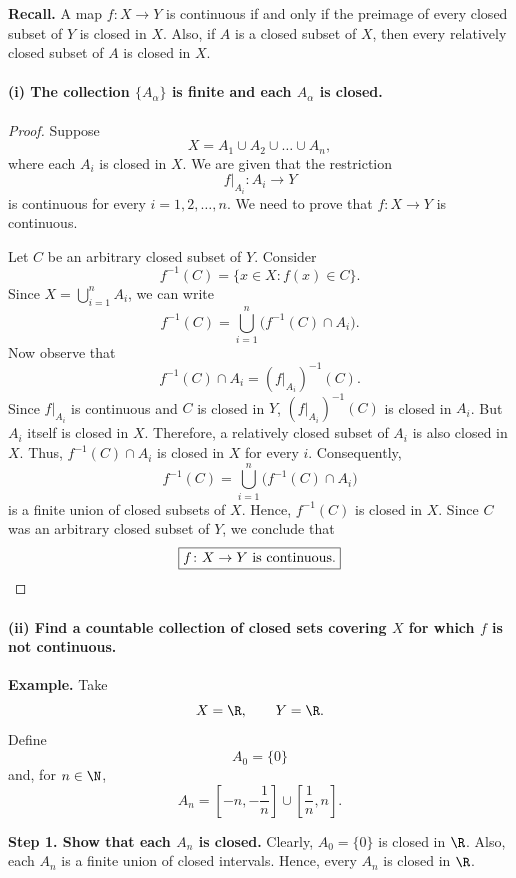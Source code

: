 
\textbf{Recall.}
A map $f\colon X\to Y$ is continuous if and only if the preimage of every closed subset of $Y$
is closed in $X$. Also, if $A$ is a closed subset of $X$, then every relatively closed subset
of $A$ is closed in $X$.

\paragraph{(i) The collection $\{A_\alpha\}$ is finite and each $A_\alpha$ is closed.}
\begin{proof}
Suppose
\[ X=A_1\cup A_2\cup\dots\cup A_n, \]
where each $A_i$ is closed in $X$. We are given that the restriction
\[ f|_{A_i}\colon A_i\to Y \]
is continuous for every $i=1,2,\dots,n$. We need to prove that $f\colon X\to Y$ is continuous.

Let $C$ be an arbitrary closed subset of $Y$. Consider
\[ f^{-1}(C)=\{x\in X : f(x)\in C\}. \]
Since $X=\bigcup_{i=1}^n A_i$, we can write
\[ f^{-1}(C)=\bigcup_{i=1}^n\bigl(f^{-1}(C)\cap A_i\bigr). \]
Now observe that
\[ f^{-1}(C)\cap A_i=(f|_{A_i})^{-1}(C). \]
Since $f|_{A_i}$ is continuous and $C$ is closed in $Y$, $(f|_{A_i})^{-1}(C)$ is closed in
$A_i$. But $A_i$ itself is closed in $X$. Therefore, a relatively closed subset of $A_i$ is
also closed in $X$. Thus, $f^{-1}(C)\cap A_i$ is closed in $X$ for every $i$. Consequently,
\[ f^{-1}(C)=\bigcup_{i=1}^n\bigl(f^{-1}(C)\cap A_i\bigr) \]
is a finite union of closed subsets of $X$. Hence, $f^{-1}(C)$ is closed in $X$. Since $C$ was
an arbitrary closed subset of $Y$, we conclude that
\[ \boxed{f\colon X\to Y\text{ is continuous.}} \qedhere \]
\end{proof}

\paragraph{(ii) Find a countable collection of closed sets covering $X$ for which $f$ is not continuous.}

\textbf{Example.} Take
\[ X=\R,\qquad Y=\R. \]
Define
\[ A_0=\{0\} \]
and, for $n\in\N$,
\[ A_n=\left[-n,-\frac1n\right]\cup\left[\frac1n,n\right]. \]

\textbf{Step 1. Show that each $A_n$ is closed.}
Clearly, $A_0=\{0\}$ is closed in $\R$. Also, each $A_n$ is a finite union of closed intervals.
Hence, every $A_n$ is closed in $\R$.

